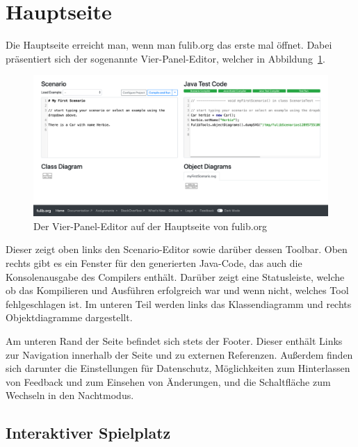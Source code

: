 \section{Hauptseite}\label{sec:main-page}

Die Hauptseite erreicht man, wenn man fulib.org das erste mal öffnet.
Dabei präsentiert sich der sogenannte Vier-Panel-Editor, welcher in Abbildung~\ref{fig:four-pane-editor}.

\begin{figure}
    \includegraphics[width=\textwidth]{chapter/fulib.org/img/four-pane-editor.png}
    \caption{Der Vier-Panel-Editor auf der Hauptseite von fulib.org}
    \label{fig:four-pane-editor}
\end{figure}

Dieser zeigt oben links den Scenario-Editor sowie darüber dessen Toolbar.
Oben rechts gibt es ein Fenster für den generierten Java-Code, das auch die Konsolenausgabe des Compilers enthält.
Darüber zeigt eine Statusleiste, welche ob das Kompilieren und Ausführen erfolgreich war und wenn nicht, welches Tool fehlgeschlagen ist.
Im unteren Teil werden links das Klassendiagramm und rechts Objektdiagramme dargestellt.

Am unteren Rand der Seite befindet sich stets der Footer.
Dieser enthält Links zur Navigation innerhalb der Seite und zu externen Referenzen.
Außerdem finden sich darunter die Einstellungen für Datenschutz,
Möglichkeiten zum Hinterlassen von Feedback und zum Einsehen von Änderungen,
und die Schaltfläche zum Wechseln in den Nachtmodus.

\subsection{Interaktiver Spielplatz}\label{subsec:interactive-playground}



